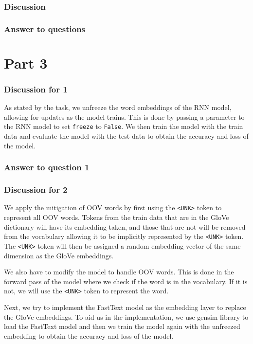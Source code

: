 \documentclass{article}
\newcommand{\code}[1]{\texttt{#1}}
\begin{document}
\subsubsection*{Discussion}

\subsubsection*{Answer to questions}

\section*{Part 3}

\subsubsection*{Discussion for 1}

As stated by the task, we unfreeze the word embeddings of the RNN model,
allowing for updates as the model trains. This is done by passing a parameter
to the RNN model to set \code{freeze} to \code{False}. We then train the model
with the train data and evaluate the model with the test data to obtain the
accuracy and loss of the model.

\subsubsection*{Answer to question 1}


\subsubsection*{Discussion for 2}

We apply the mitigation of OOV words by first using the \code{<UNK>} token to
represent all OOV words. Tokens from the train data that are in the GloVe
dictionary will have its embedding taken, and those that are not will be
removed from the vocabulary allowing it to be implicitly represented by the
\code{<UNK>} token. The \code{<UNK>} token will then be assigned a random
embedding vector of the same dimension as the GloVe embeddings.

We also have to modify the model to handle OOV words. This is done in the
forward pass of the model where we check if the word is in the vocabulary. If
it is not, we will use the \code{<UNK>} token to represent the word.

Next, we try to implement the FastText model as the embedding layer to replace
the GloVe embeddings. To aid us in the implementation, we use gensim library to
load the FastText model and then we train the model again with the unfreezed
embedding to obtain the accuracy and loss of the model.
\end{document}
